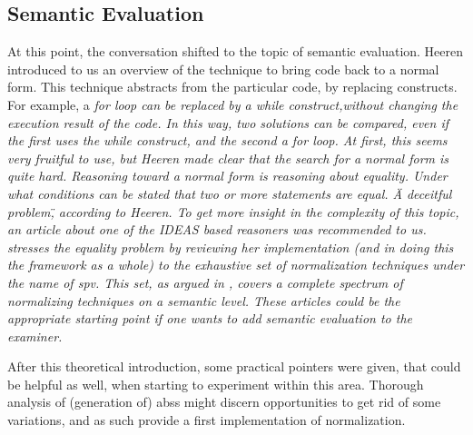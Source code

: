 \subsection{Semantic Evaluation} %
At this point, the conversation shifted to the topic of semantic evaluation.
Heeren introduced to us an overview of the technique to bring code back to a
normal form. This technique abstracts from the particular code, by replacing 
constructs. For example, a \em{for loop} can be replaced by a \em{while construct},without 
changing the execution result of the code. In this way, two solutions can be
compared, even if the first uses the \em{while} construct, and the second a 
\em{for loop}. At first, this seems very fruitful to use, but Heeren made clear
that the search for a normal form is quite hard. Reasoning toward a normal form
is reasoning about equality. Under what conditions can be stated that two or 
more statements are equal. \"A deceitful problem\", according to Heeren. To 
get more insight in the complexity of this topic, an article about one of the
IDEAS based reasoners was recommended to us. \citep{keuning2014strategy} 
stresses the equality problem by reviewing her implementation (and in
doing this the framework as a whole) to the exhaustive set of normalization 
techniques under the name of \gls{spv}. This set, as argued in 
\citep{xu2003transformation}, covers a complete spectrum of normalizing 
techniques on a semantic level. These articles could be the appropriate 
starting point if one wants to add semantic evaluation to the \gls{examiner}.


After this theoretical introduction, some practical pointers were given, that
could be helpful as well, when starting to experiment within this area. 
Thorough analysis of (generation of) \glspl{abs} might discern opportunities 
to get rid of some variations, and as such provide a first implementation of
normalization. %



	



